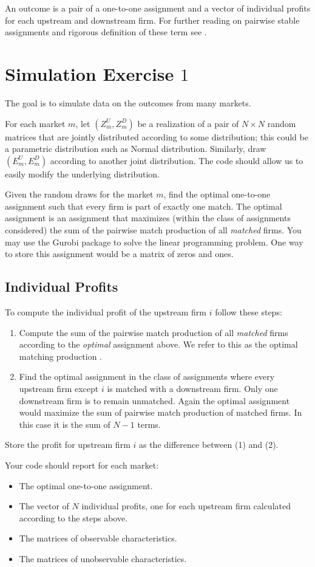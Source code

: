 \documentclass[letterpaper,12pt]{article}
\begin{document}
An outcome is a pair of a one-to-one assignment and a vector of individual profits for each upstream and downstream firm. For further reading on pairwise stable assignments and rigorous definition of these term see \citet{roth1990two}.

\section{Simulation Exercise $1$} 
The goal is to simulate data on the outcomes from many markets. 

For each market $m$, let $(Z_m^U, Z_m^D)$ be a realization of a pair of $N \times N$ random matrices that are jointly distributed according to some distribution; this could be a parametric distribution such as  Normal distribution. Similarly, draw $(E_m^U, E_m^D)$ according to another joint distribution. The code should allow us to easily modify the underlying distribution. 

Given the random draws for the market $m$, find the optimal one-to-one assignment such that every firm is part of exactly one match. The optimal assignment is an assignment  that maximizes (within the class of assignments considered) the sum of the pairwise match production of all \emph{matched} firms. You may use the Gurobi package to solve the linear programming problem. One way to store this assignment would be a matrix of zeros and ones. 

\subsection*{Individual Profits} 
To compute the individual profit of the upstream firm $i$ follow these steps: 
\begin{enumerate}
  \item Compute the sum of the pairwise match production of all \emph{matched} firms according to the \emph{optimal} assignment above. We refer to this as the optimal matching production .
  \item Find the optimal assignment in the class of assignments where every upstream firm except  $i$ is matched with a downstream firm. Only one downstream firm is  to remain unmatched. Again the optimal assignment would maximize the sum of pairwise match production of matched firms. In this case it is the sum of $N-1$ terms. 
\end{enumerate}
Store the profit for upstream firm $i$ as the difference between (1) and (2). 

Your code should report for each market:
\begin{itemize}
  \item The optimal one-to-one assignment.
  \item The vector of $N$ individual profits, one for each upstream firm calculated according to the steps above.
  \item The matrices of observable characteristics. 
  \item The matrices of unobservable characteristics. 
\end{itemize}
\end{document}

